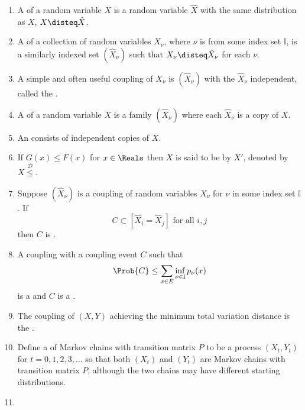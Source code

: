 \documentclass[12pt]{article}
\begin{document}
\begin{enumerate}
    \item
        A  of a random variable \( X \) is a random variable \(
        \hat{X} \) with the same distribution as \( X \), \( X \disteq
        \hat{X} \).
    \item
        A  of a collection of random variables \( X_\nu \),
        where \( \nu \) is from some index set \( \mathbb{I} \), is a
        similarly indexed set \( (\hat{X}_\nu) \) such that \( X_{\nu}
        \disteq \hat{X}_{\nu} \) for each \( \nu \).
    \item
        A simple and often useful coupling of \( X_{\nu} \) is \( (\hat{X}_\nu)
        \) with the \( \hat{X}_{\nu} \) independent, called the .
    \item
        A  of a random variable \( X \) is a family \(
        (\hat{X}_\nu) \) where each \( \hat{X}_\nu \) is a copy of \( X \).
    \item
        An  consists of independent copies of \(
        X \).
    \item
        If \( G(x) \le F(x) \) for \( x \in \Reals \) then \( X \) is
        said to be  by \( X' \), denoted
        by \( X \stackrel{\mathcal{D}}{\le} \).
    \item
        Suppose \( (\hat{X}_{\nu}) \) is a coupling of random variables \(
        X_{\nu} \) for \( \nu \) in some index set \( \mathbb{I} \).  If
        \[
            C \subset [ \hat{X}_i = \hat{X}_j] \text{ for all } i,j
        \] then \( C \) is .
    \item
        A coupling with a coupling event \( C \) such that
        \[
            \Prob{C} \le \sum\limits_{x \in E} \inf_{\nu \in \mathbb{I}}
            p_\nu(x)
        \] is a  and \( C \) is a .
    \item
        The coupling of \( (X,Y) \) achieving the minimum total
        variation distance is the .
    \item
        Define a  of Markov chains with transition matrix
        \( P \) to be a process \( (X_t, Y_t) \) for \( t = 0, 1,2,3,
        \dots \) so that both \( (X_t) \) and \( (Y_t) \) are Markov
        chains with transition matrix \( P \), although the two chains
        may have different starting distributions.
    \item

\end{enumerate}
\end{document}
